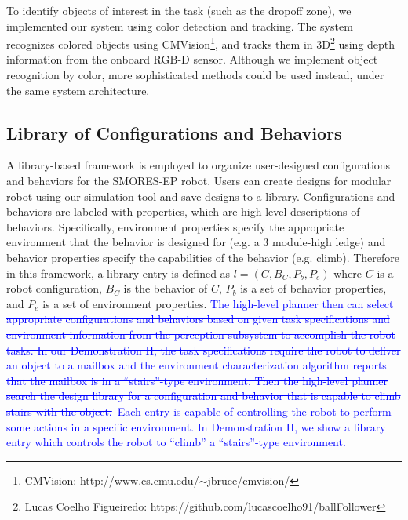 \documentclass[12pt]{article}
\newcommand{\cbj}[2]{\textcolor{blue}{\sout{#1}}\textcolor{blue}{~#2}}
\begin{document}
To identify objects of interest in the task (such as the dropoff zone), we implemented our system using color detection and tracking.  The system recognizes colored objects using CMVision\footnote{CMVision: http://www.cs.cmu.edu/$\sim$jbruce/cmvision/}, and tracks them in 3D\footnote{Lucas Coelho Figueiredo: https://github.com/lucascoelho91/ballFollower} using depth information from the onboard RGB-D sensor. Although we implement object recognition by color, more sophisticated methods could be used instead, under the same system architecture.

%



\subsection{Library of Configurations and Behaviors}
\label{sec:supplement-configuration-specifics}

A library-based framework is employed to organize user-designed configurations and behaviors for the SMORES-EP robot.
Users can create designs for modular robot using our simulation tool and save designs to a library.
Configurations and behaviors are labeled with properties, which are high-level descriptions of behaviors.
Specifically, environment properties specify the appropriate environment that the behavior is designed for (e.g. a 3 module-high ledge) and behavior properties specify the capabilities of the behavior (e.g. climb). 
Therefore in this framework, a library entry is defined as $l = (C,B_C,P_b,P_e)$ where $C$ is a robot configuration, $B_C$ is the behavior of $C$, $P_b$ is a set of behavior properties, and $P_e$ is a set of environment properties. \cbj{The high-level planner then can select appropriate configurations and behaviors based on given task specifications and environment information from the perception subsystem to accomplish the robot tasks.
In our Demonstration II, the task specifications require the robot to deliver an object to a mailbox and the environment characterization algorithm reports that the mailbox is in a ``stairs''-type environment.
Then the high-level planner search the design library for a configuration and behavior that is capable to climb stairs with the object.}{Each entry is capable of controlling the robot to perform some actions in a specific environment. In Demonstration II, we show a library entry which controls the robot to ``climb'' a ``stairs''-type environment.}
\end{document}
